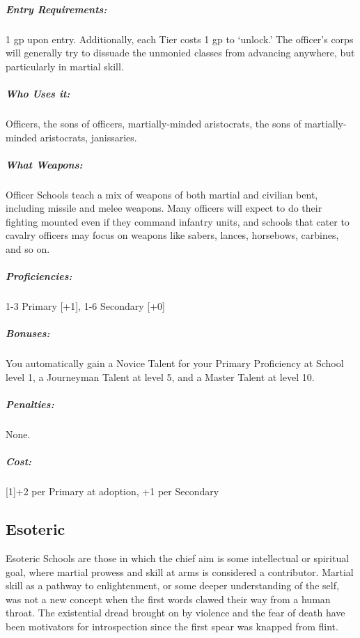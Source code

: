 \documentclass[oneside,11pt,english]{book}
\begin{document}
\vspace{-15pt}\subparagraph{Entry Requirements:} 1 gp upon entry. Additionally, each Tier costs 1 gp to ‘unlock.’ The officer’s corps will generally try to dissuade the unmonied classes from advancing anywhere, but particularly in martial skill. 
\vspace{-15pt}\subparagraph{Who Uses it:} Officers, the sons of officers, martially-minded aristocrats, the sons of martially-minded aristocrats, janissaries. 
\vspace{-15pt}\subparagraph{What Weapons:} Officer Schools teach a mix of weapons of both martial and civilian bent, including missile and melee weapons. Many officers will expect to do their fighting mounted even if they command 
infantry units, and schools that cater to cavalry officers may focus on weapons like sabers, lances, 
horsebows, carbines, and so on. 
\vspace{-15pt}\subparagraph{Proficiencies:} 1-3 Primary [+1], 1-6 Secondary [+0] 
\vspace{-15pt}\subparagraph{Bonuses:} You automatically gain a Novice Talent for your Primary Proficiency at School level 1, a 
Journeyman Talent at level 5, and a Master Talent at level 10. 
\vspace{-15pt}\subparagraph{Penalties:} None.
\vspace{-15pt}\subparagraph{Cost:} [1]+2 per Primary at adoption, +1 per Secondary 

\subsection{Esoteric}
Esoteric Schools are those in which the chief aim is some intellectual or spiritual goal, where martial 
prowess and skill at arms is considered a contributor. Martial skill as a pathway to enlightenment, or some 
deeper understanding of the self, was not a new concept when the first words clawed their way from a 
human throat. The existential dread brought on by violence and the fear of death have been motivators for 
introspection since the first spear was knapped from flint. 
\end{document}
